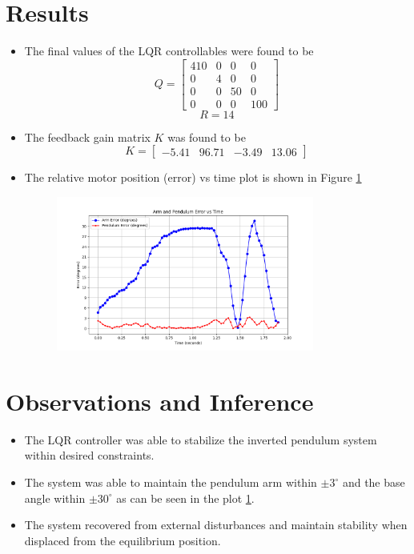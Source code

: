 \documentclass{article}
\begin{document}
\section{Results}

\begin{itemize}[nolistsep]
    \item The final values of the LQR controllables were found to be $$Q = \begin{bmatrix} 410 & 0 & 0 & 0 \\ 0 & 4 & 0 & 0 \\ 0 & 0 & 50 & 0 \\ 0 & 0 & 0 & 100 \end{bmatrix}$$ $$R = 14$$
    \vspace{-10pt}
    \item The feedback gain matrix $K$ was found to be $$K = \begin{bmatrix} -5.41 & 96.71 & -3.49 & 13.06 \end{bmatrix}$$
    \item The relative motor position (error) vs time plot is shown in Figure \ref{fig:plot}
    \vspace{-10pt}
    \begin{figure}[!htb]
        \centering
        \includegraphics[width=0.8\textwidth]{../././inv_pendulum.png}
        \label{fig:plot}
    \end{figure}
\end{itemize}

\section{Observations and Inference}
\begin{itemize}[nolistsep]
    \item The LQR controller was able to stabilize the inverted pendulum system within desired constraints.
    \item The system was able to maintain the pendulum arm within $\pm 3^{\circ}$ and the base angle within $\pm 30^{\circ}$ as can be seen in the plot \ref{fig:plot}.
    \item The system recovered from external disturbances and maintain stability when displaced from the equilibrium position.
\end{itemize}


\end{document}
